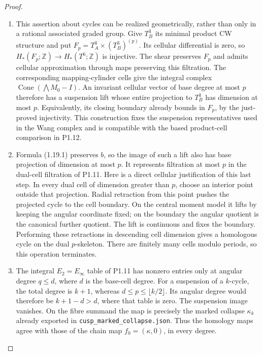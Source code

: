 \documentclass[11pt,a4paper]{article}
\theoremstyle{definition}
\begin{document}
\begin{proof}
\begin{enumerate}[label=\arabic*.]
\item This assertion about cycles can be realized geometrically, rather
than only in a rational associated graded group.  Give $T_B^3$ its
minimal product CW structure and put
$F_p=T_A^3\times(T_B^3)^{(p)}$.
Its cellular differential is zero, so
$H_*(F_p;\mathbb Z)\to H_*(T^6;\mathbb Z)$ is injective.
The shear preserves $F_p$ and admits cellular approximation through
maps preserving this filtration.  The corresponding mapping-cylinder
cells give the integral complex
$\operatorname{Cone}(\bigwedge M_0-I)$.
An invariant cellular vector of base degree at most $p$ therefore
has a suspension lift whose entire projection to $T_B^3$ has dimension
at most $p$.  Equivalently, its closing boundary already bounds in
$F_p$, by the just-proved injectivity.  This construction fixes the
suspension representatives used in the Wang complex and is compatible
with the based product-cell comparison in P1.12.

\item Formula (1.19.1) preserves $b$, so the image of such a lift also has
base projection of dimension at most $p$.  It represents filtration
at most $p$ in the dual-cell filtration of P1.11.  Here is a direct
cellular justification of this last step.  In every dual cell of
dimension greater than $p$, choose an interior point outside that
projection.  Radial retraction from this point pushes the projected
cycle to the cell boundary.  On the central moment model it lifts
by keeping the angular coordinate fixed; on the boundary the angular
quotient is the canonical further quotient.  The lift is continuous
and fixes the boundary.  Performing these retractions in descending
cell dimension gives a homologous cycle on the dual $p$-skeleton.
There are finitely many cells modulo periods, so this operation
terminates.

\item The integral $E_2=E_\infty$ table of P1.11 has nonzero entries only
at angular degree $q\leq d$, where $d$ is the base-cell degree.
For a suspension of a $k$-cycle, the total degree is $k+1$, whereas
$d\leq p\leq\lfloor k/2\rfloor$. Its angular degree would therefore
be $k+1-d>d$, where that table is zero.  The suspension image
vanishes.  On the fibre summand the map is precisely the marked
collapse $\kappa_k$ already exported in
\texttt{cusp\_marked\_collapse.json}.  Thus the homology maps agree
with those of the chain map $f_0=(\kappa,0)$, in every degree.


\end{enumerate}
\end{proof}
\end{document}
